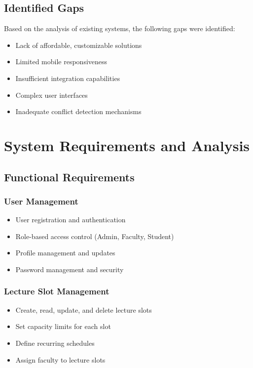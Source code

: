\documentclass[12pt,a4paper]{report}
\begin{document}
\section{Identified Gaps}
Based on the analysis of existing systems, the following gaps were identified:
\begin{itemize}[leftmargin=*]
    \item Lack of affordable, customizable solutions
    \item Limited mobile responsiveness
    \item Insufficient integration capabilities
    \item Complex user interfaces
    \item Inadequate conflict detection mechanisms
\end{itemize}

\chapter{System Requirements and Analysis}

\section{Functional Requirements}

\subsection{User Management}
\begin{itemize}[leftmargin=*]
    \item User registration and authentication
    \item Role-based access control (Admin, Faculty, Student)
    \item Profile management and updates
    \item Password management and security
\end{itemize}

\subsection{Lecture Slot Management}
\begin{itemize}[leftmargin=*]
    \item Create, read, update, and delete lecture slots
    \item Set capacity limits for each slot
    \item Define recurring schedules
    \item Assign faculty to lecture slots
\end{itemize}
\end{document}

